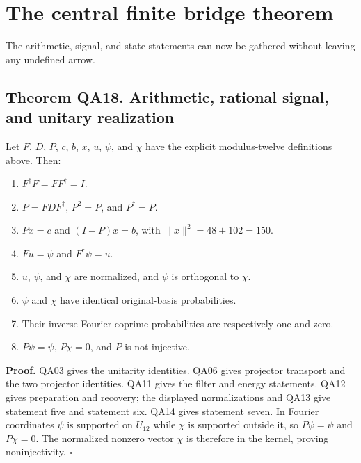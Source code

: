 \hypertarget{the-central-finite-bridge-theorem}{%
\section{The central finite bridge
theorem}\label{the-central-finite-bridge-theorem}}

The arithmetic, signal, and state statements can now be gathered without
leaving any undefined arrow.

\hypertarget{theorem-qa18.-arithmetic-rational-signal-and-unitary-realization}{%
\subsection*{Theorem QA18. Arithmetic, rational signal, and unitary
realization}\label{theorem-qa18.-arithmetic-rational-signal-and-unitary-realization}}

Let \(F\), \(D\), \(P\), \(c\), \(b\), \(x\), \(u\), \(\psi\), and
\(\chi\) have the explicit modulus-twelve definitions above. Then:

\begin{enumerate}
\def\labelenumi{\arabic{enumi}.}

\item
  \(F^\dagger F=FF^\dagger=I\).
\item
  \(P=FDF^\dagger\), \(P^2=P\), and \(P^\dagger=P\).
\item
  \(Px=c\) and \((I-P)x=b\), with \(\|x\|^2=48+102=150\).
\item
  \(Fu=\psi\) and \(F^\dagger\psi=u\).
\item
  \(u\), \(\psi\), and \(\chi\) are normalized, and \(\psi\) is
  orthogonal to \(\chi\).
\item
  \(\psi\) and \(\chi\) have identical original-basis probabilities.
\item
  Their inverse-Fourier coprime probabilities are respectively one and
  zero.
\item
  \(P\psi=\psi\), \(P\chi=0\), and \(P\) is not injective.
\end{enumerate}

\textbf{Proof.} QA03 gives the unitarity identities. QA06 gives
projector transport and the two projector identities. QA11 gives the
filter and energy statements. QA12 gives preparation and recovery; the
displayed normalizations and QA13 give statement five and statement six.
QA14 gives statement seven. In Fourier coordinates \(\psi\) is supported
on \(U_{12}\) while \(\chi\) is supported outside it, so \(P\psi=\psi\)
and \(P\chi=0\). The normalized nonzero vector \(\chi\) is therefore in
the kernel, proving noninjectivity. \(\square\)

